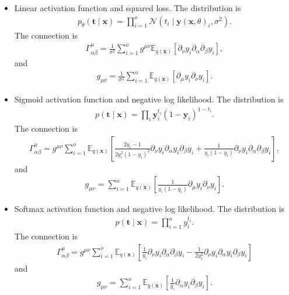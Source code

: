\documentclass{amsart}
\theoremstyle{definition}
\theoremstyle{remark}
\numberwithin{equation}{section}
\newcommand{\cal}[1]{\mathcal{#1}}
\newcommand{\mbf}[1]{\mathbf{#1}}
\newcommand{\mbb}[1]{\mathbb{#1}}
\begin{document}
\begin{itemize}
	\item Linear activation function and squared loss. The distribution is
	\begin{align*}
	p_\theta(\mbf{t}\mid\mbf{x}) = \prod_{i=1}^o \cal{N}(t_i\mid \mbf{y}(\mbf{x},\theta)_i,\sigma^2).
	\end{align*}
	The connection is
	\begin{align*}
	\Gamma^\mu_{\alpha\beta} = \frac{1}{\sigma^2} \sum_{i=1}^{o} g^{\mu\nu} \mbb{E}_{q(\mbf{x})}[ \partial_\nu y_i \partial_\alpha \partial_\beta y_i],
	\end{align*}
	and
	\begin{align*}
	g_{\mu\nu} = \frac{1}{\sigma^2}\sum_{i=1}^o \mbb{E}_{q(\mbf{x})}[\partial_\mu y_i \partial_\nu y_i].
	\end{align*}
	\item Sigmoid activation function and negative log likelihood. The distribution is
	\begin{align*}
	p(\mbf{t}\mid\mbf{x}) = \prod_i \mbf{y}_i^{t_i} (1-\mbf{y}_i)^{1-t_i}.
	\end{align*}
	The connection is
	\begin{align*}
	\Gamma^\mu_{\alpha\beta} = g^{\mu\nu} \sum_{i=1}^o \mbb{E}_{q(\mbf{x})}\left[ \frac{2y_i-1}{2y_i^2(1-y_i)^2} \partial_\nu y_i \partial_\alpha y_i \partial_\beta y_i + \frac{1}{y_i(1-y_i)}\partial_\nu y_i\partial_\alpha\partial_\beta y_i \right],
	\end{align*}
	and
	\begin{align*}
	g_{\mu\nu} = \sum_{i=1}^{o} \mbb{E}_{q(\mbf{x})} \left[ \frac{1}{y_i(1-y_i)}\partial_\mu y_i \partial_\nu y_i\right].
	\end{align*}
	\item Softmax activation function and negative log likelihood. The distribution is
	\begin{align*}
	p(\mbf{t}\mid\mbf{x}) = \prod_{i=1}^o y_i^{t_i}.
	\end{align*}
	The connection is
	\begin{align*}
	\Gamma_{\alpha\beta}^\mu = g^{\mu\nu}\sum_{i=1}^o \mbb{E}_{q(\mbf{x})}\left[ \frac{1}{y_i}\partial_\nu y_i \partial_\alpha\partial_\beta y_i - \frac{1}{2y_i^2}\partial_\nu y_i \partial_\alpha y_i \partial_\beta y_i \right]
	\end{align*}
	and
	\begin{align*}
	g_{\mu\nu} = \sum_{i=1}^o \mbb{E}_{q(\mbf{x})}\left[\frac{1}{y_i}\partial_\alpha y_i \partial_\beta y_i\right].
	\end{align*}
\end{itemize}
\end{document}
